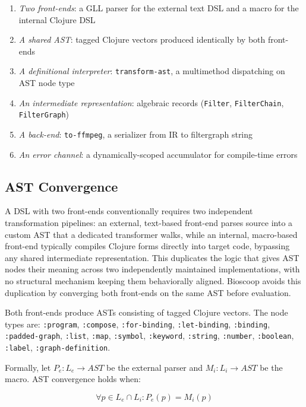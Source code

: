 \documentclass[english,submission]{programming}
\begin{document}
\begin{enumerate}
\item \emph{Two front-ends}: a GLL parser for the external text DSL and a macro for the internal Clojure DSL
\item \emph{A shared AST}: tagged Clojure vectors produced identically by both front-ends
\item \emph{A definitional interpreter}: \texttt{transform-ast}, a multimethod dispatching on AST node type
\item \emph{An intermediate representation}: algebraic records (\texttt{Filter}, \texttt{FilterChain}, \texttt{FilterGraph})
\item \emph{A back-end}: \texttt{to-ffmpeg}, a serializer from IR to filtergraph string
\item \emph{An error channel}: a dynamically-scoped accumulator for compile-time errors
\end{enumerate}

\subsection{AST Convergence}\label{sec:ast-convergence}

A DSL with two front-ends conventionally requires two independent transformation pipelines: an external, text-based front-end parses source into a custom AST that a dedicated transformer walks, while an internal, macro-based front-end typically compiles Clojure forms directly into target code, bypassing any shared intermediate representation. This duplicates the logic that gives AST nodes their meaning across two independently maintained implementations, with no structural mechanism keeping them behaviorally aligned. Bioscoop avoids this duplication by converging both front-ends on the same AST before evaluation.

Both front-ends produce ASTs consisting of tagged Clojure vectors. The node types are: \texttt{:program}, \texttt{:compose}, \texttt{:for-binding}, \texttt{:let-binding}, \texttt{:binding}, \texttt{:padded-graph}, \texttt{:list}, \texttt{:map}, \texttt{:symbol}, \texttt{:keyword}, \texttt{:string}, \texttt{:number}, \texttt{:boolean}, \texttt{:label}, \texttt{:graph-definition}.

Formally, let $P_e : L_e \rightarrow AST$ be the external parser and $M_i : L_i \rightarrow AST$ be the macro. AST convergence holds when:

\begin{equation}
\forall p \in L_e \cap L_i : P_e(p) = M_i(p)
\end{equation}
\end{document}
